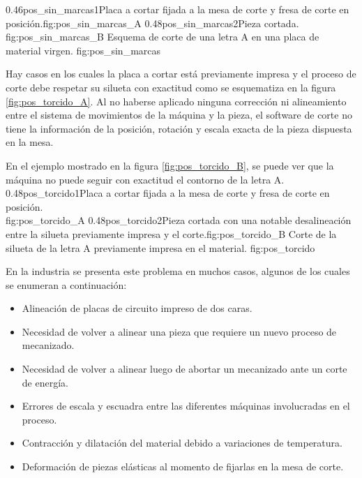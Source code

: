 \subfigab
         {0.46}{pos_sin_marcas1}{Placa a cortar fijada a la mesa de corte y fresa de corte en posición.}{fig:pos_sin_marcas_A}
         {0.48}{pos_sin_marcas2}{Pieza cortada.\\ \hphantom{1}}{fig:pos_sin_marcas_B}
         {Esquema de corte de una letra A en una placa de material virgen.}
         {fig:pos_sin_marcas}

         Hay casos en los cuales la placa a cortar está previamente impresa y el proceso de corte debe respetar su silueta con exactitud como se esquematiza en la figura \ref{fig:pos_torcido_A}.
         Al no haberse aplicado ninguna corrección ni alineamiento entre el sistema de movimientos de la máquina y la pieza, el software de corte no tiene la información de la posición, rotación y escala exacta de la pieza dispuesta en la mesa. \par
         En el ejemplo mostrado en la figura \ref{fig:pos_torcido_B}, se puede ver que la máquina no puede seguir con exactitud el contorno de la letra A.\\

\subfigab
         {0.48}{pos_torcido1}{Placa a cortar fijada a la mesa de corte y fresa de corte en posición.\\ \vphantom{1}}{fig:pos_torcido_A}
         {0.48}{pos_torcido2}{Pieza cortada con una notable desalineación entre la silueta previamente impresa y el corte.}{fig:pos_torcido_B}
         {Corte de la silueta de la letra A previamente impresa en el material.}
         {fig:pos_torcido}

         En la industria se presenta este problema en muchos casos, algunos de los cuales se enumeran a continuación:
\begin{itemize}
   \item{Alineación de placas de circuito impreso de dos caras.}
   \item{Necesidad de volver a alinear una pieza que requiere un nuevo proceso de mecanizado.}
   \item{Necesidad de volver a alinear luego de abortar un mecanizado ante un corte de energía.}
   \item{Errores de escala y escuadra entre las diferentes máquinas involucradas en el proceso.}
   \item{Contracción y dilatación del material debido a variaciones de temperatura.}
   \item{Deformación de piezas elásticas al momento de fijarlas en la mesa de corte.}
\end{itemize}

